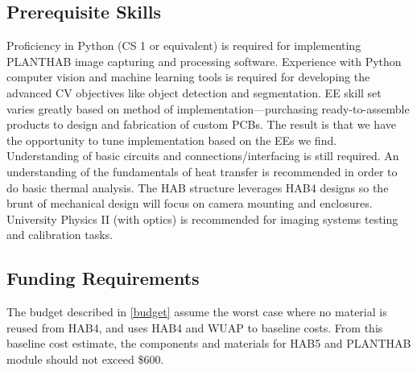 \documentclass[conference]{IEEEtran} %
\begin{document}
\subsection{Prerequisite Skills}
Proficiency in Python (CS 1 or equivalent) is required for implementing PLANTHAB image capturing and processing software. 
Experience with Python computer vision and machine learning tools is required for developing the advanced CV objectives like object detection and segmentation. 
EE skill set varies greatly based on method of implementation---purchasing ready-to-assemble products to design and fabrication of custom PCBs. 
The result is that we have the opportunity to tune implementation based on the EEs we find. 
Understanding of basic circuits and connections/interfacing is still required. 
An understanding of the fundamentals of heat transfer is recommended in order to do basic thermal analysis. 
The HAB structure leverages HAB4 designs so the brunt of mechanical design will focus on camera mounting and enclosures. 
University Physics II (with optics) is recommended for imaging systems testing and calibration tasks.

\subsection{Funding Requirements}
\label{funding}


The budget described in \autoref{budget} assume the worst case where no material is reused from HAB4, and uses HAB4 and WUAP to baseline costs.
From this baseline cost estimate, the components and materials for HAB5 and PLANTHAB module should not exceed \$600.
\end{document}
